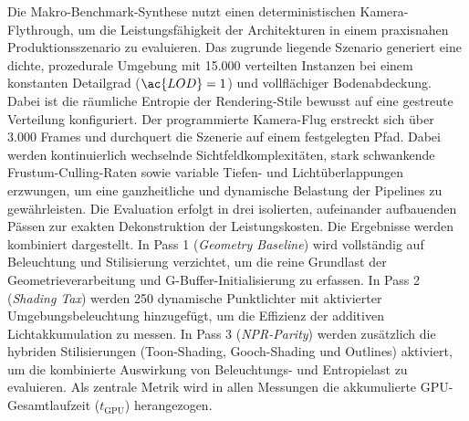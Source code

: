 Die Makro-Benchmark-Synthese nutzt einen deterministischen Kamera-Flythrough, um die Leistungsfähigkeit der
Architekturen in einem praxisnahen Produktionsszenario zu evaluieren.
Das zugrunde liegende Szenario generiert eine dichte, prozedurale Umgebung mit 15.000 verteilten Instanzen bei einem
konstanten Detailgrad ($\ac{LOD} = 1$) und vollflächiger Bodenabdeckung.
Dabei ist die räumliche Entropie der Rendering-Stile bewusst auf eine gestreute Verteilung konfiguriert.
Der programmierte Kamera-Flug erstreckt sich über $3.000$ Frames und durchquert die Szenerie auf einem festgelegten Pfad.
Dabei werden kontinuierlich wechselnde Sichtfeldkomplexitäten, stark schwankende Frustum-Culling-Raten sowie variable
Tiefen- und Lichtüberlappungen erzwungen, um eine ganzheitliche und dynamische Belastung der Pipelines zu gewährleisten.
Die Evaluation erfolgt in drei isolierten, aufeinander aufbauenden Pässen zur exakten Dekonstruktion der Leistungskosten.
Die Ergebnisse werden kombiniert dargestellt.
In Pass 1 (\textit{Geometry Baseline}) wird vollständig auf Beleuchtung und Stilisierung verzichtet, um die reine
Grundlast der Geometrieverarbeitung und \ac{G-Buffer}-Initialisierung zu erfassen.
In Pass 2 (\textit{Shading Tax}) werden 250 dynamische Punktlichter mit aktivierter Umgebungsbeleuchtung hinzugefügt, um
die Effizienz der additiven Lichtakkumulation zu messen.
In Pass 3 (\textit{\ac{NPR}-Parity}) werden zusätzlich die hybriden Stilisierungen (Toon-Shading, Gooch-Shading und
Outlines) aktiviert, um die kombinierte Auswirkung von Beleuchtungs- und Entropielast zu evaluieren.
Als zentrale Metrik wird in allen Messungen die akkumulierte \ac{GPU}-Gesamtlaufzeit ($t_{\text{GPU}}$) herangezogen.

